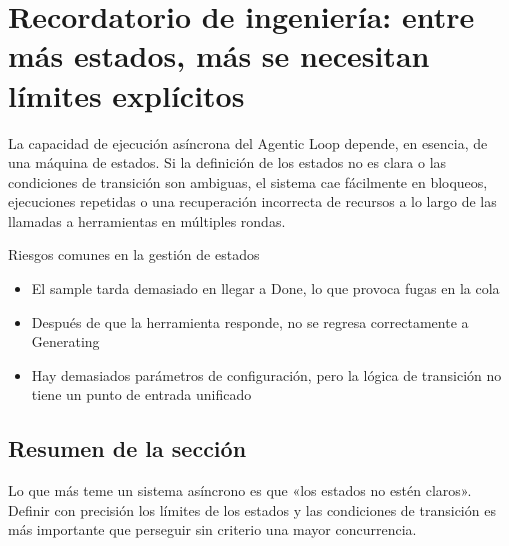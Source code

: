 \section{Recordatorio de ingeniería: entre más estados, más se necesitan límites explícitos}
La capacidad de ejecución asíncrona del Agentic Loop depende, en esencia, de una máquina de estados. Si la definición de los estados no es clara o las condiciones de transición son ambiguas, el sistema cae fácilmente en bloqueos, ejecuciones repetidas o una recuperación incorrecta de recursos a lo largo de las llamadas a herramientas en múltiples rondas.

\begin{warningbox}{Riesgos comunes en la gestión de estados}
\begin{itemize}
  \item El sample tarda demasiado en llegar a Done, lo que provoca fugas en la cola
  \item Después de que la herramienta responde, no se regresa correctamente a Generating
  \item Hay demasiados parámetros de configuración, pero la lógica de transición no tiene un punto de entrada unificado
\end{itemize}
\end{warningbox}

\subsection{Resumen de la sección}
Lo que más teme un sistema asíncrono es que «los estados no estén claros». Definir con precisión los límites de los estados y las condiciones de transición es más importante que perseguir sin criterio una mayor concurrencia.

\newpage
